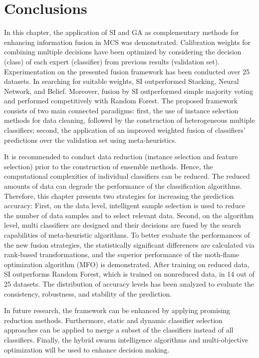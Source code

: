%
%


\section{Conclusions}
\label{sec:4_8_Conclusions}


In this chapter, the application of SI and GA as complementary methods for enhancing information fusion in MCS was demonstrated. Calibration weights for combining multiple decisions have been optimized by considering the decision (class) of each expert (classifier) from previous results (validation set). Experimentation on the presented fusion framework has been conducted over 25 datasets. In searching for suitable weights, SI outperformed Stacking, Neural Network, and Belief. Moreover, fusion by SI outperformed simple majority voting and performed competitively with Random Forest. The proposed framework consists of two main connected paradigms: first, the use of instance selection methods for data cleaning, followed by the construction of heterogeneous multiple classifiers; second, the application of an improved weighted fusion of classifiers' predictions over the validation set using meta-heuristics. 

It is recommended to conduct data reduction (instance selection and feature selection) prior to the construction of ensemble methods. Hence, the computational complexities of individual classifiers can be reduced. The reduced amounts of data can degrade the performance of the classification algorithms. Therefore, this chapter presents two strategies for increasing the prediction accuracy: First, on the data level, intelligent sample selection is used to reduce the number of data samples and to select relevant data. Second, on the algorithm level, multi classifiers are designed and their decisions are fused by the search capabilities of meta-heuristic algorithms. To better evaluate the performances of the new fusion strategies, the statistically significant differences are calculated via rank-based transformations, and the superior performance of the moth-flame optimization algorithm (MFO) is demonstrated. After training on reduced data, SI outperforms Random Forest, which is trained on nonreduced data, in 14 out of 25 datasets. The distribution of accuracy levels has been analyzed to evaluate the consistency, robustness, and stability of the prediction.

In future research, the framework can be enhanced by applying promising reduction methods. Furthermore, static and dynamic classifier selection approaches can be applied to merge a subset of the classifiers instead of all classifiers. Finally, the hybrid swarm intelligence algorithms and multi-objective optimization will be used to enhance decision making.



